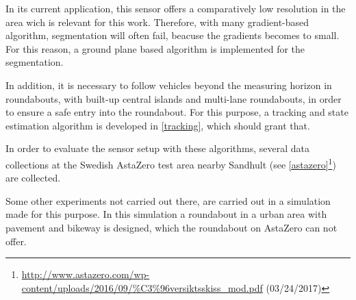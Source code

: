 \documentclass[11pt,oneside,openright]{mpreport}
\begin{document}

In its current application, this sensor offers a comparatively low resolution in the area wich is relevant for this work.
Therefore, with many gradient-based algorithm, segmentation will often fail, beacuse the gradients becomes to small.
For this reason, a ground plane based algorithm is implemented for the segmentation.


In addition, it is necessary to follow vehicles beyond the measuring horizon in roundabouts, with built-up central islands and multi-lane roundabouts, 
in order to ensure a safe entry into the roundabout.
For this purpose, a tracking and state estimation algorithm is developed in \cref{tracking}, which should grant that.


In order to evaluate the sensor setup with these algorithms, several data collections at the Swedish AstaZero test area nearby Sandhult
(see \cref{astazero}\footnote{\url{http://www.astazero.com/wp-content/uploads/2016/09/\%C3\%96versiktsskiss_mod.pdf} (03/24/2017)}) are collected.

Some other experiments not carried out there, are carried out in a simulation made for this purpose. In this simulation a roundabout in a urban area 
with pavement and bikeway is designed, which the roundabout on AstaZero can not offer.
\end{document}
